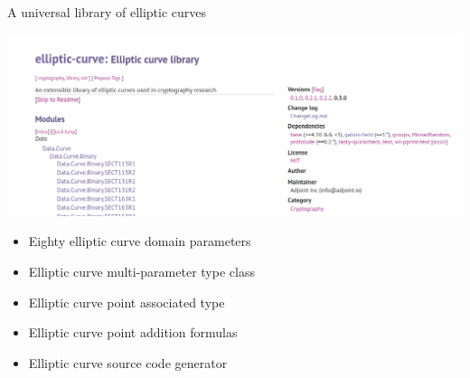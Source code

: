 \documentclass[11pt]{beamer}
\begin{document}
\begin{frame}{A universal library of elliptic curves}

\pause

\begin{center}

\includegraphics[width=\textwidth]{elliptic-curve.png}

\end{center}

\pause

\begin{itemize}[<+->]
\item Eighty elliptic curve domain parameters
\item Elliptic curve multi-parameter type class
\item Elliptic curve point associated type
\item Elliptic curve point addition formulas
\item Elliptic curve source code generator
\end{itemize}

\end{frame}
\end{document}
